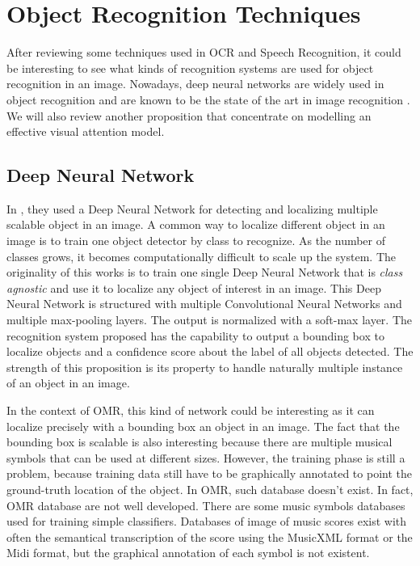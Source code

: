 \documentclass[11pt]{sdm}
\begin{document}
\section{Object Recognition Techniques}

After reviewing some techniques used in OCR and Speech Recognition, it could be interesting to see what kinds of recognition systems are used for object recognition in an image.
Nowadays, deep neural networks are widely used in object recognition and are known to be the state of the art in image recognition \cite{erhan_scalable_2014}.
We will also review another proposition \cite{ba_multiple_2014} that concentrate on modelling an effective visual attention model.

\subsection{Deep Neural Network}

In \cite{erhan_scalable_2014}, they used a Deep Neural Network for detecting and localizing multiple scalable object in an image.
A common way to localize different object in an image is to train one object detector by class to recognize.
As the number of classes grows, it becomes computationally difficult to scale up the system.
The originality of this works is to train one single Deep Neural Network that is \textit{class agnostic} and use it to localize any object of interest in an image.
This Deep Neural Network is structured with multiple Convolutional Neural Networks and multiple max-pooling layers.
The output is normalized with a soft-max layer.
The recognition system proposed has the capability to output a bounding box to localize objects and a confidence score about the label of all objects detected.
The strength of this proposition is its property to handle naturally multiple instance of an object in an image.

In the context of OMR, this kind of network could be interesting as it can localize precisely with a bounding box an object in an image.
The fact that the bounding box is scalable is also interesting because there are multiple musical symbols that can be used at different sizes.
However, the training phase is still a problem, because training data still have to be graphically annotated to point the ground-truth location of the object.
In OMR, such database doesn't exist.
In fact, OMR database are not well developed.
There are some music symbols databases used for training simple classifiers.
Databases of image of music scores exist with often the semantical transcription of the score using the MusicXML format or the Midi format, but the graphical annotation of each symbol is not existent.
\end{document}
